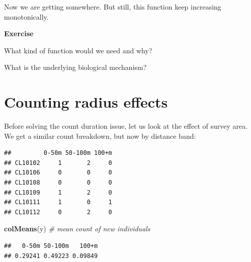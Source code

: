 \documentclass[12pt,]{book}
\newenvironment{Shaded}{\begin{snugshade}}{\end{snugshade}}
\newcommand{\CommentTok}[1]{\textcolor[rgb]{0.56,0.35,0.01}{\textit{#1}}}
\newcommand{\KeywordTok}[1]{\textcolor[rgb]{0.13,0.29,0.53}{\textbf{#1}}}
\newcommand{\NormalTok}[1]{#1}
\newcommand{\OperatorTok}[1]{\textcolor[rgb]{0.81,0.36,0.00}{\textbf{#1}}}
\newcommand{\StringTok}[1]{\textcolor[rgb]{0.31,0.60,0.02}{#1}}
\let\BeginKnitrBlock\begin \let\EndKnitrBlock\end
\begin{document}
Now we are getting somewhere. But still, this function keep
increasing monotonically.

\BeginKnitrBlock{rmdexercise}
\textbf{Exercise}

What kind of function would we need and why?

What is the underlying biological mechanism?
\EndKnitrBlock{rmdexercise}

\hypertarget{counting-radius-effects}{%
\section{Counting radius effects}\label{counting-radius-effects}}

Before solving the count duration issue, let us look at the
effect of survey area.
We get a similar count breakdown, but now by distance band:

\begin{Shaded}
\end{Shaded}

\begin{verbatim}
##         0-50m 50-100m 100+m
## CL10102     1       2     0
## CL10106     0       0     0
## CL10108     0       0     0
## CL10109     1       2     0
## CL10111     1       0     1
## CL10112     0       2     0
\end{verbatim}

\begin{Shaded}
\begin{Highlighting}[]
\KeywordTok{colMeans}\NormalTok{(y) }\CommentTok{# mean count of new individuals}
\end{Highlighting}
\end{Shaded}

\begin{verbatim}
##   0-50m 50-100m   100+m 
## 0.29241 0.49223 0.09849
\end{verbatim}
\end{document}
